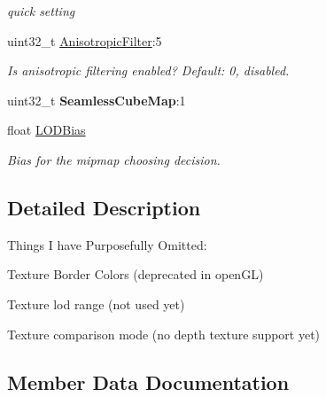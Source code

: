 \begin{DoxyCompactItemize}
\begin{DoxyCompactList}\small\item\em quick setting \end{DoxyCompactList}\item 
uint32\+\_\+t \hyperlink{classirr_1_1video_1_1STextureSamplingParams_afade72ccc4119dd793f918a19739c087}{Anisotropic\+Filter}\+:5
\begin{DoxyCompactList}\small\item\em Is anisotropic filtering enabled? Default\+: 0, disabled. \end{DoxyCompactList}\item 
uint32\+\_\+t {\bfseries Seamless\+Cube\+Map}\+:1\hypertarget{classirr_1_1video_1_1STextureSamplingParams_a366530ec4c5b7c4aae8ca0226e8d2107}{}\label{classirr_1_1video_1_1STextureSamplingParams_a366530ec4c5b7c4aae8ca0226e8d2107}

\item 
float \hyperlink{classirr_1_1video_1_1STextureSamplingParams_a827a14535af4128fc677df4786e11070}{L\+O\+D\+Bias}
\begin{DoxyCompactList}\small\item\em Bias for the mipmap choosing decision. \end{DoxyCompactList}\end{DoxyCompactItemize}


\subsection{Detailed Description}
Things I have Purposefully Omitted\+: 


\begin{DoxyItemize}
\item Texture Border Colors (deprecated in open\+GL)
\item Texture lod range (not used yet)
\item Texture comparison mode (no depth texture support yet) 
\end{DoxyItemize}

\subsection{Member Data Documentation}
